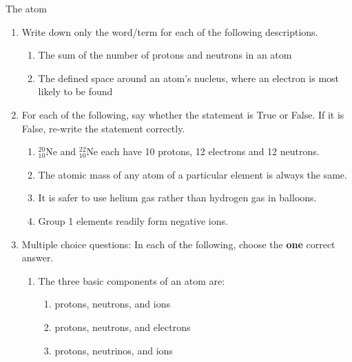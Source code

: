 \begin{eocexercises}{The atom}
            \nopagebreak \noindent
      \label{m38741*id263110}\begin{enumerate}[noitemsep, label=\textbf{\arabic*}. ] 
\label{m38741*uid189}\item Write down only the word/term for each of the following descriptions.
\label{m38741*id263126}\begin{enumerate}[noitemsep, label=\textbf{\alph*}. ] 
            \label{m38741*uid190}\item The sum of the number of protons and neutrons in an atom
\label{m38741*uid191}\item The defined space around an atom's nucleus, where an electron is most likely to be found
\end{enumerate}
                \label{m38741*uid192}\item For each of the following, say whether the statement is True or False. If it is False, re-write the statement correctly.
\label{m38741*id263169}\begin{enumerate}[noitemsep, label=\textbf{\alph*}. ] 
            \label{m38741*uid193}\item $_{10}^{20}\text{Ne}$ and $_{10}^{22}\text{Ne}$ each have 10 protons, 12 electrons and 12 neutrons.
\label{m38741*uid194}\item The atomic mass of any atom of a particular element is always the same.
\label{m38741*uid195}\item It is safer to use helium gas rather than hydrogen gas in balloons.
\label{m38741*uid196}\item Group 1 elements readily form negative ions.
\end{enumerate}
                \label{m38741*uid197}\item Multiple choice questions: In each of the following, choose the \textbf{one} correct answer.
\label{m38741*id263273}\begin{enumerate}[noitemsep, label=\textbf{\alph*}. ] 
 \label{m38741*uid198}\item The three basic components of an atom are:
\label{m38741*id263289}\begin{enumerate}[noitemsep, label=\textbf{\roman*}. ] 
            \label{m38741*uid199}\item protons, neutrons, and ions
\label{m38741*uid200}\item protons, neutrons, and electrons
\label{m38741*uid201}\item protons, neutrinos, and ions

\end{enumerate}
\end{enumerate}
\end{enumerate}
\end{eocexercises}
